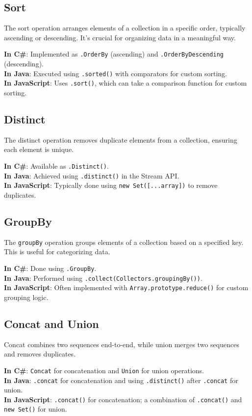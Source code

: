 \subsection*{Sort}
The sort operation arranges elements of a collection in a specific order, typically ascending or descending. It's crucial for organizing data in a meaningful way.

\textbf{In C\#}: Implemented as \texttt{.OrderBy} (ascending) and \texttt{.OrderByDescending} (descending). \\
\textbf{In Java}: Executed using \texttt{.sorted()} with comparators for custom sorting. \\
\textbf{In JavaScript}: Uses \texttt{.sort()}, which can take a comparison function for custom sorting.

\subsection*{Distinct}
The distinct operation removes duplicate elements from a collection, ensuring each element is unique.

\textbf{In C\#}: Available as \texttt{.Distinct()}. \\
\textbf{In Java}: Achieved using \texttt{.distinct()} in the Stream API. \\
\textbf{In JavaScript}: Typically done using \texttt{new Set([...array])} to remove duplicates.

\subsection*{GroupBy}
The \texttt{groupBy} operation groups elements of a collection based on a specified key. This is useful for categorizing data.

\textbf{In C\#}: Done using \texttt{.GroupBy}. \\
\textbf{In Java}: Performed using \texttt{.collect(Collectors.groupingBy())}. \\
\textbf{In JavaScript}: Often implemented with \texttt{Array.prototype.reduce()} for custom grouping logic.

\subsection*{Concat and Union}
Concat combines two sequences end-to-end, while union merges two sequences and removes duplicates.

\textbf{In C\#}: \texttt{Concat} for concatenation and \texttt{Union} for union operations. \\
\textbf{In Java}: \texttt{.concat} for concatenation and using \texttt{.distinct()} after \texttt{.concat} for union. \\
\textbf{In JavaScript}: \texttt{.concat()} for concatenation; a combination of \texttt{.concat()} and \texttt{new Set()} for union.

